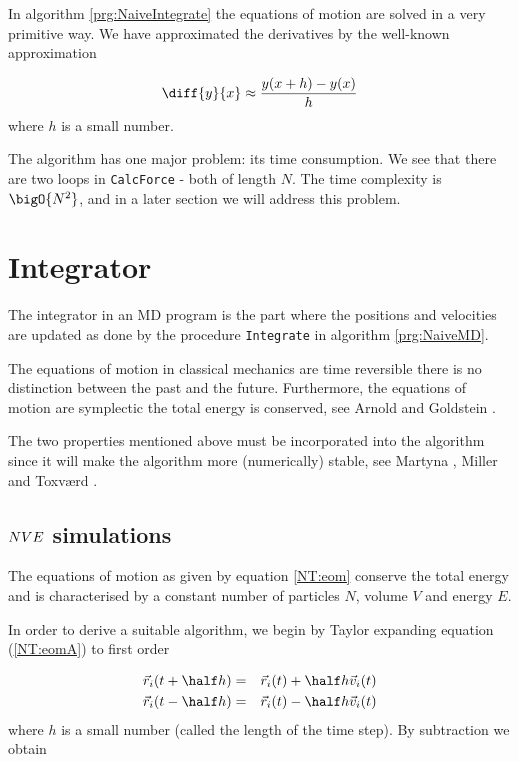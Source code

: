 In algorithm \ref{prg:NaiveIntegrate} the equations of motion are
solved in a very primitive way. We have approximated the derivatives
by the well-known approximation

\begin{equation}
  \diff{y}{x} \approx \frac{y(x+h) - y(x)}{h}
\end{equation}
where $h$ is a small number. 

The algorithm has one major problem: its time consumption. We see that
there are two loops in \texttt{CalcForce} - both of length $N$. The
time complexity is $\bigO{N^2}$, and in a later section we will
address this problem.


\section{Integrator}
\label{sect:Intgr}
The integrator in an MD program is the part where the positions and
velocities are updated as done by the procedure \texttt{Integrate}
in algorithm \ref{prg:NaiveMD}.

The equations of motion in classical mechanics are time reversible \ie
there is no distinction between the past and the future. Furthermore,
the equations of motion are symplectic \ie the total energy is
conserved, see \eg Arnold \cite{Arnold74} and Goldstein
\cite{Goldstein80}.

The two properties mentioned above must be incorporated into the
algorithm since it will make the algorithm more (numerically) stable,
see \eg Martyna \etal \cite{Martyna95}, Miller \cite{Miller91} and
Toxv{\ae}rd \cite{Toxvaerd94a}. 

\subsection{\protect$NVE\protect$ simulations}
\label{sect:NVEsimul}
The equations of motion as given by equation \eqref{NT:eom} conserve
the total energy and is characterised by a constant number of particles
$N$, volume $V$ and energy $E$. 

In order to derive a suitable algorithm, we begin by Taylor expanding
equation (\ref{NT:eomA}) to first order \ie

\begin{eqnarray*}
  \vec{r}_i(t+\half h) &=& \vec{r}_i(t) + \half h\vec{v}_i(t) \\
  \vec{r}_i(t-\half h) &=& \vec{r}_i(t) - \half h\vec{v}_i(t) 
\end{eqnarray*}
where $h$ is a small number (called the length of the time step). By
subtraction we obtain

